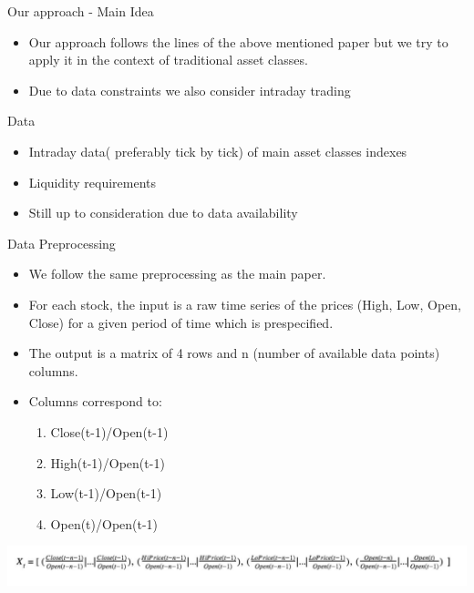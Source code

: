 \documentclass[10pt]{beamer}
\begin{document}
\begin{frame}{Our approach - Main Idea}
\begin{itemize}
    \item Our approach follows the lines of the above mentioned paper but we try to apply it in the context of traditional asset classes.
    \item Due to data constraints we also consider intraday trading
\end{itemize}
\end{frame}

\begin{frame}{Data}
\begin{itemize}
    \item Intraday data( preferably tick by tick) of main asset classes indexes 
    \item Liquidity requirements
    \item Still up to consideration due to data availability
\end{itemize}
\end{frame}



\begin{frame}{ Data Preprocessing}
\begin{itemize}
    \item We follow the same preprocessing as the main paper.
    \item For each stock, the input is a raw time series of the prices (High, Low, Open, Close) for a given period of time which is prespecified.
    \item The output is a matrix of 4 rows and n (number of available data points) columns.
    \item Columns correspond to:
    \begin{enumerate}
        \item Close(t-1)/Open(t-1)
        \item High(t-1)/Open(t-1)
        \item Low(t-1)/Open(t-1)
        \item Open(t)/Open(t-1)
    \end{enumerate}
\end{itemize}
\includegraphics[width=\textwidth]{Figures/inputTensor.png}
\end{frame}
\end{document}
